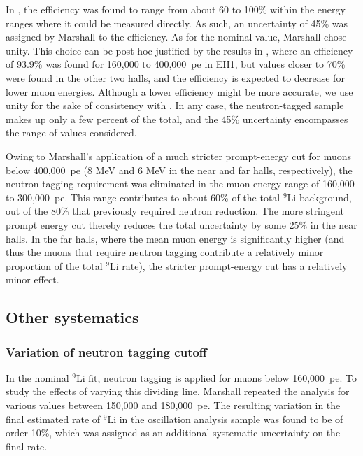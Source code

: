 \documentclass[../thesis.tex]{subfiles}
\begin{document}
In \cite{WeiLi9}, the efficiency was found to range from about 60 to 100\% within the energy ranges where it could be measured directly. As such, an uncertainty of 45\% was assigned by Marshall to the efficiency. As for the nominal value, Marshall chose unity. This choice can be post-hoc justified by the results in \cite{MaWuLi9}, where an efficiency of 93.9\% was found for 160,000 to 400,000~pe in EH1, but values closer to 70\% were found in the other two halls, and the efficiency is expected to decrease for lower muon energies. %
Although a lower efficiency might be more accurate, we use unity for the sake of consistency with \cite{ChrisLi9}. In any case, the neutron-tagged sample makes up only a few percent of the total, and the 45\% uncertainty encompasses the range of values considered.

Owing to Marshall's application of a much stricter prompt-energy cut for muons below 400,000~pe (8 MeV and 6 MeV in the near and far halls, respectively), the neutron tagging requirement was eliminated in the muon energy range of 160,000 to 300,000~pe. This range contributes to about 60\% of the total $^9$Li background, out of the 80\% that previously required neutron reduction. The more stringent prompt energy cut thereby reduces the total uncertainty by some 25\% in the near halls. In the far halls, where the mean muon energy is significantly higher (and thus the muons that require neutron tagging contribute a relatively minor proportion of the total $^9$Li rate), the stricter prompt-energy cut has a relatively minor effect.

\subsection{Other systematics}
\label{sec:bkgLi9FitSyst}

\subsubsection{Variation of neutron tagging cutoff}
\label{sec:bkgLi9NeuTagCutoff}

In the nominal $^9$Li fit, neutron tagging is applied for muons below 160,000~pe. To study the effects of varying this dividing line, Marshall repeated the analysis for various values between 150,000 and 180,000~pe. The resulting variation in the final estimated rate of $^9$Li in the oscillation analysis sample was found to be of order 10\%, which was assigned as an additional systematic uncertainty on the final rate.
\end{document}
